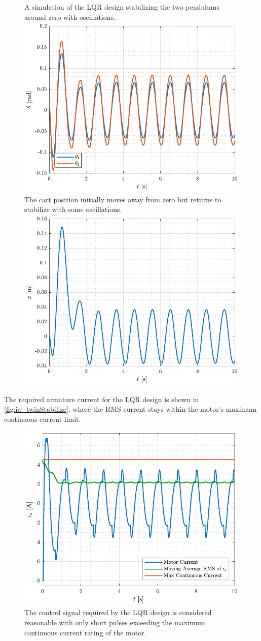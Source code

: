 %
\begin{figure}[H]
  \hspace{-10pt}
  \captionbox
  {
    A simulation of the LQR design stabilizing the two pendulums around zero with oscillations.
    \label{fig:theta_twinStabilize}
  }
  {
    \hspace{-1cm}
    \includegraphics[width=.4\textwidth]{figures/theta_twinStabilize}
  }
  \hspace{20pt}
  \captionbox 
  {
    The cart position initially moves away from zero but returns to stabilize with some oscillations.
    \label{fig:x_twinStabilize}
  }
  {
    \hspace{-1cm}
    \includegraphics[width=.4\textwidth]{figures/x_twinStabilize}
  }  
\end{figure}
%
The required armature current for the LQR design is shown in \autoref{fig:ia_twinStabilize}, where the RMS current stays within the motor's maximum continuous current limit.
%
\begin{figure}[H]
  \includegraphics[width=.5\textwidth]{figures/ia_twinStabilize}
  \caption{The control signal required by the LQR design is considered reasonable with only short pulses exceeding the maximum continuous current rating of the motor.}
  \label{fig:ia_twinStabilize}
\end{figure}
